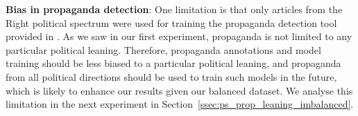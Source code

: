\noindent\textbf{Bias in propaganda detection}: One limitation is that only articles from the Right political spectrum were used for training the propaganda detection tool provided in \cite{da2019fine}. %
As we saw in our first experiment, propaganda is not limited to any particular political leaning. Therefore, propaganda annotations and model training should be less biased to a particular political leaning, and propaganda from all political directions should be used to train such models in the future, which is likely to enhance our results given our balanced dataset. We analyse this limitation in the next experiment in Section~\ref{ssec:ps_prop_leaning_imbalanced}.


